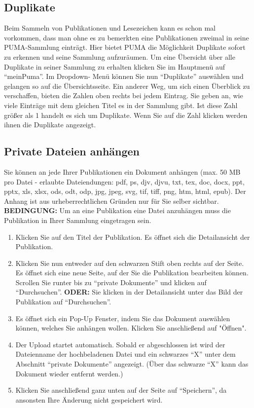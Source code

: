\documentclass[a4paper,11pt,twoside]{scrbook}
\begin{document}
\subsection{Duplikate}
Beim Sammeln von Publikationen und Lesezeichen kann es schon mal vorkommen, dass man ohne es zu bemerkten eine Publikationen zweimal in seine PUMA-Sammlung einträgt. Hier bietet PUMA die Möglichkeit Duplikate sofort zu erkennen und seine Sammlung aufzuräumen. Um eine Übersicht über alle Duplikate in seiner Sammlung zu erhalten klicken Sie im Hauptmenü auf \enquote{meinPuma}. Im Dropdown- Menü können Sie nun \enquote{Duplikate} auswählen und gelangen so auf die Übersichtsseite. Ein anderer Weg, um sich einen Überblick zu verschaffen, bieten die Zahlen oben rechts bei jedem Eintrag. Sie geben an, wie viele Einträge mit dem gleichen Titel es in der Sammlung gibt. Ist diese Zahl größer als 1 handelt es sich um Duplikate. Wenn Sie auf die Zahl klicken werden ihnen die Duplikate angezeigt.
\subsection{Private Dateien anhängen}
Sie können an jede Ihrer Publikationen ein Dokument anhängen (max. 50 MB pro Datei - erlaubte Dateiendungen: pdf, ps, djv, djvu, txt, tex, doc, docx, ppt, pptx, xls, xlsx, ods, odt, odp, jpg, jpeg, svg, tif, tiff, png, htm, html, epub). Der Anhang ist aus urheberrechtlichen Gründen nur für Sie selber sichtbar.
\newline
\newline
\textbf{BEDINGUNG:} Um an eine Publikation eine Datei anzuhängen muss die Publikation in Ihrer Sammlung eingetragen sein.
\begin{enumerate}
    \item Klicken Sie auf den Titel der Publikation. Es öffnet sich die Detailansicht der Publikation.
    \item Klicken Sie nun entweder auf den schwarzen Stift oben rechts auf der Seite. Es öffnet sich eine neue Seite, auf der Sie die Publikation bearbeiten können. Scrollen Sie runter bis zu \enquote{private Dokumente} und klicken auf \enquote{Durchsuchen}. \newline \textbf{ODER:} Sie klicken in der Detailansicht unter das Bild der Publikation auf \enquote{Durchsuchen}.
    \item Es öffnet sich ein Pop-Up Fenster, indem Sie das Dokument auswählen können, welches Sie anhängen wollen. Klicken Sie anschließend auf "Öffnen".
    \item Der Upload startet automatisch. Sobald er abgeschlossen ist wird der Dateienname der hochbeladenen Datei und ein schwarzes \enquote{X} unter dem Abschnitt \enquote{private Dokumente} angezeigt. (Über das schwarze \enquote{X} kann das Dokument wieder entfernt werden.)
    \item Klicken Sie anschließend ganz unten auf der Seite auf \enquote{Speichern}, da ansonsten Ihre Änderung nicht gespeichert wird.
\end{enumerate}
\end{document}

